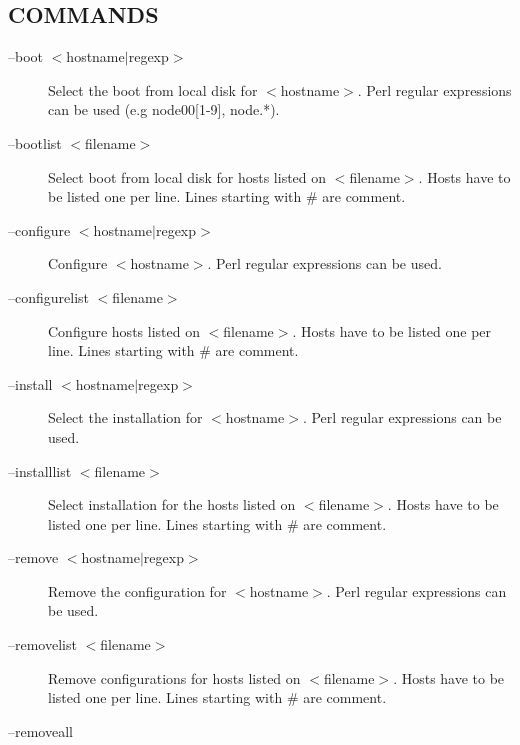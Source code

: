 \subsection*{COMMANDS\label{edg-installfe_COMMANDS}}
\begin{description}

\item[--boot $<$hostname$|$regexp$>$] \mbox{}

Select the boot from local disk for $<$hostname$>$. Perl regular
expressions can be used (e.g node00[1-9], node.*).


\item[--bootlist $<$filename$>$] \mbox{}

Select boot from local disk for hosts listed on $<$filename$>$. Hosts have to
be listed one per line. Lines starting with \# are comment.


\item[--configure $<$hostname$|$regexp$>$] \mbox{}

Configure $<$hostname$>$. Perl regular expressions can be used.


\item[--configurelist $<$filename$>$] \mbox{}

Configure hosts listed on $<$filename$>$. Hosts have to
be listed one per line. Lines starting with \# are comment.


\item[--install $<$hostname$|$regexp$>$] \mbox{}

Select the installation for $<$hostname$>$. Perl regular expressions
can be used.


\item[--installlist $<$filename$>$] \mbox{}

Select installation for the hosts listed on $<$filename$>$. Hosts have to
be listed one per line. Lines starting with \# are comment.


\item[--remove $<$hostname$|$regexp$>$] \mbox{}

Remove the configuration for $<$hostname$>$. Perl regular expressions
can be used.


\item[--removelist $<$filename$>$] \mbox{}

Remove configurations for hosts listed on $<$filename$>$. Hosts have to
be listed one per line. Lines starting with \# are comment.


\item[--removeall] \mbox{}


\end{description}
